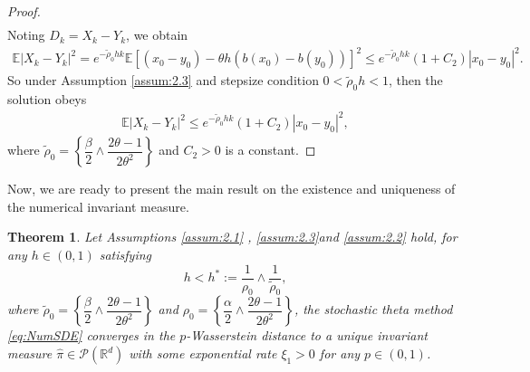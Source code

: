 \documentclass{article}
\newtheorem{theorem}{Theorem}[section]
\begin{document}
\begin{proof}
\begin{align*}
\end{align*}
Noting $D_k = X_k - Y_k$, we obtain 
\begin{align*}
	\mathbb{E}|X_k - Y_k|^2 = e^{-\tilde{\rho}_0 h k} \mathbb{E}\left[ (x_0 - y_0) - \theta h (b(x_0) - b(y_0)) \right]^2 
	\leq e^{-\tilde{\rho}_0 h k}(1 + C_2) |x_0 - y_0|^2.
\end{align*}
So under Assumption \ref{assum:2.3} and stepsize condition $ 0 < \tilde{\rho}_0 h < 1 $, then the solution obeys
\begin{align*}
	\mathbb{E}|X_k - Y_k|^2 \leq e^{-\tilde{\rho}_0 h k} (1 + C_2) |x_0 - y_0|^2,
\end{align*}
where $\tilde{\rho}_0 = \left\{\dfrac{\beta}{2}\wedge \dfrac{2\theta-1}{2\theta^2}\right\}$ and $C_2 > 0$ is a constant.
\end{proof}

Now, we are ready to present the main result on the existence and uniqueness of the numerical invariant measure.
\begin{theorem}\label{thm:1}
Let Assumptions \ref{assum:2.1} , \ref{assum:2.3}and \ref{assum:2.2} hold, for any $h \in (0, 1)$ satisfying
\[
h < h^* := \frac{1}{\rho_0} \wedge \frac{1}{\tilde{\rho}_0},
\]
where $\tilde{\rho}_0 = \left\{\dfrac{\beta}{2} \wedge \dfrac{2\theta-1}{2\theta^2}\right\}$ and 
$\rho_0 = \left\{ \dfrac{\alpha}{2}\wedge \dfrac{2\theta - 1}{2\theta^2} \right\}$,
the stochastic theta method \eqref{eq:NumSDE} converges in the $p$-Wasserstein distance to a unique invariant measure $\widehat{\pi} \in \mathcal{P}(\mathbb{R}^d)$ with some exponential rate $\xi_1 > 0$ for any $p \in (0, 1)$.
\end{theorem}
\end{document}
